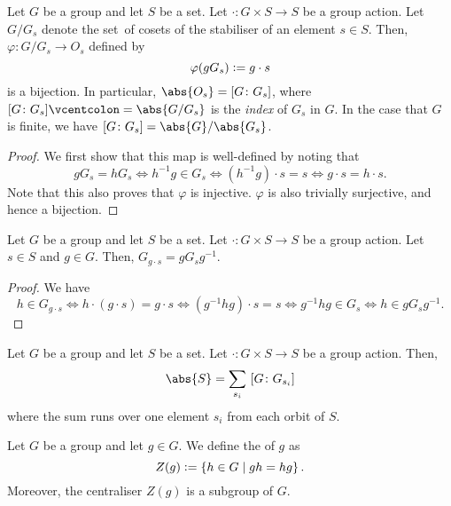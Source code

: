 \begin{theorem} \label{thm:orbit-stabiliser}
    Let $G$ be a group and let $S$ be a set. Let $\cdot \colon G \times S \to S$ be a group action. Let $G/G_s$ denote the set\footnotemark\ of cosets of the stabiliser of an element $s \in S$. Then, $\varphi \colon G/G_s \to O_s$ defined by
    \[
        \varphi(gG_s) \vcentcolon= g \cdot s
    \]
    is a bijection. In particular, $\abs{O_s} = [G \colon G_s]$, where $[G \colon G_s] \vcentcolon= \abs{G/G_s}$ is the \emph{index} of $G_s$ in $G$. In the case that $G$ is finite, we have $[G \colon G_s] = \abs{G} / \abs{G_s}$.
\end{theorem}
\begin{proof}
    We first show that this map is well-defined by noting that
    \[
        gG_s = hG_s \iff h^{-1}g \in G_s \iff (h^{-1}g) \cdot s = s \iff g\cdot s = h\cdot s.
    \]
    Note that this also proves that $\varphi$ is injective. $\varphi$ is also trivially surjective, and hence a bijection. 
\end{proof}

\begin{prop}
    Let $G$ be a group and let $S$ be a set. Let $\cdot \colon G \times S \to S$ be a group action. Let $s \in S$ and $g \in G$. Then, $G_{g \cdot s} = g G_s g^{-1}.$
\end{prop}
\begin{proof}
    We have 
    \[
        h \in G_{g \cdot s} \iff h \cdot (g \cdot s) = g \cdot s \iff (g^{-1}hg) \cdot s = s \iff g^{-1}hg \in G_s \iff h \in gG_sg^{-1}.
    \]
\end{proof}

\begin{cor} \label{cor:|S|-in-terms-of-indices-of-stabilisers}
    Let $G$ be a group and let $S$ be a set. Let $\cdot \colon G \times S \to S$ be a group action. Then, 
    \[
        \abs{S} = \sum_{s_i} \, \left[ G \colon G_{s_i} \right]
    \]
    where the sum runs over one element $s_i$ from each orbit of $S$. 
\end{cor}

\begin{defn}
    Let $G$ be a group and let $g \in G$. We define the  of $g$ as
    \[
        Z(g) \vcentcolon= \left\{ h \in G \mid gh = hg \right\}.
    \]
    Moreover, the centraliser $Z(g)$ is a subgroup of $G$.
\end{defn}

